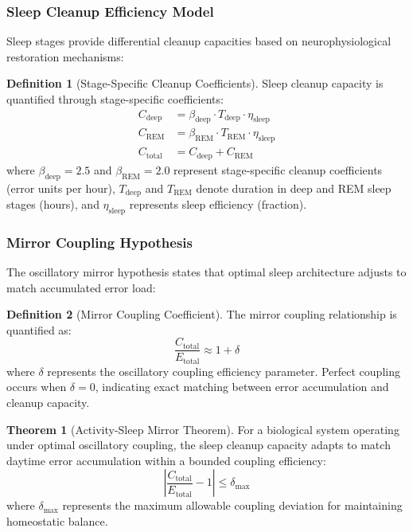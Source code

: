 \documentclass[12pt,a4paper]{article}
\theoremstyle{definition}
\newtheorem{definition}{Definition}[section]
\newtheorem{theorem}{Theorem}[section]
\begin{document}
\subsubsection{Sleep Cleanup Efficiency Model}

Sleep stages provide differential cleanup capacities based on neurophysiological restoration mechanisms:

\begin{definition}[Stage-Specific Cleanup Coefficients]
Sleep cleanup capacity is quantified through stage-specific coefficients:
\begin{align}
C_{\text{deep}} &= \beta_{\text{deep}} \cdot T_{\text{deep}} \cdot \eta_{\text{sleep}} \\
C_{\text{REM}} &= \beta_{\text{REM}} \cdot T_{\text{REM}} \cdot \eta_{\text{sleep}} \\
C_{\text{total}} &= C_{\text{deep}} + C_{\text{REM}}
\label{eq:cleanup_capacity}
\end{align}
where $\beta_{\text{deep}} = 2.5$ and $\beta_{\text{REM}} = 2.0$ represent stage-specific cleanup coefficients (error units per hour), $T_{\text{deep}}$ and $T_{\text{REM}}$ denote duration in deep and REM sleep stages (hours), and $\eta_{\text{sleep}}$ represents sleep efficiency (fraction).
\end{definition}

\subsubsection{Mirror Coupling Hypothesis}

The oscillatory mirror hypothesis states that optimal sleep architecture adjusts to match accumulated error load:

\begin{definition}[Mirror Coupling Coefficient]
The mirror coupling relationship is quantified as:
\begin{equation}
\frac{C_{\text{total}}}{E_{\text{total}}} \approx 1 + \delta
\label{eq:mirror_coefficient}
\end{equation}
where $\delta$ represents the oscillatory coupling efficiency parameter. Perfect coupling occurs when $\delta = 0$, indicating exact matching between error accumulation and cleanup capacity.
\end{definition}

\begin{theorem}[Activity-Sleep Mirror Theorem]
For a biological system operating under optimal oscillatory coupling, the sleep cleanup capacity adapts to match daytime error accumulation within a bounded coupling efficiency:
\begin{equation}
\left| \frac{C_{\text{total}}}{E_{\text{total}}} - 1 \right| \leq \delta_{\text{max}}
\end{equation}
where $\delta_{\text{max}}$ represents the maximum allowable coupling deviation for maintaining homeostatic balance.
\end{theorem}
\end{document}
